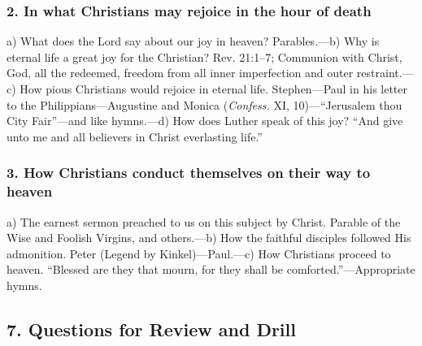 \subsubsection{2. In what Christians may rejoice in the hour of death}

a) What does the Lord say about our joy in heaven? Parables.—b) Why is eternal life a great joy for the Christian? Rev. 21:1–7; Communion with Christ, God, all the redeemed, freedom from all inner imperfection and outer restraint.—c) How pious Christians would rejoice in eternal life. Stephen—Paul in his letter to the Philippians—Augustine and Monica (\emph{Confess.} XI, 10)—“Jerusalem thou City Fair”—and like hymns.—d) How does Luther speak of this joy? “And give unto me and all believers in Christ everlasting life.”

\subsubsection{3. How Christians conduct themselves on their way to heaven}

a) The earnest sermon preached to us on this subject by Christ. Parable of the Wise and Foolish Virgins, and others.—b) How the faithful disciples followed His admonition. Peter (Legend by Kinkel)—Paul.—c) How Christians proceed to heaven. “Blessed are they that mourn, for they shall be comforted.”—Appropriate hymns.

\subsection{7. Questions for Review and Drill}

